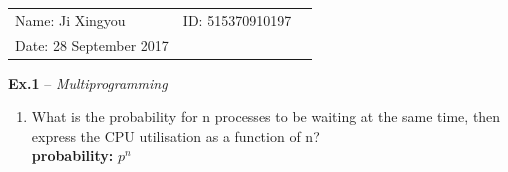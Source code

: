 \documentclass{article}
\begin{document}
\begin{spacing}{2.0}
\vspace*{0.25cm}

\hrulefill

\thispagestyle{empty}

\begin{center}
\begin{large}
\end{large}

\hrulefill

\vspace*{5cm}
\begin{Large}
\end{Large}

\vspace{2em}

\end{center}


\vfill

\begin{table}[h!]
\flushleft
\begin{tabular}{lll}
Name: Ji Xingyou \hspace*{2em}&
ID: 515370910197\hspace*{2em}
\\

Date: 28 September 2017

\end{tabular}
\end{table}

\hfill

\newpage
\noindent\textbf{Ex.1} -- \textit{Multiprogramming}\\
\begin{enumerate}
\item What is the probability for n processes to be waiting at the same time, then express the CPU utilisation as a function of n?\\
\textbf{probability:}
$p^n$


\end{enumerate}
\end{spacing}
\end{document}
